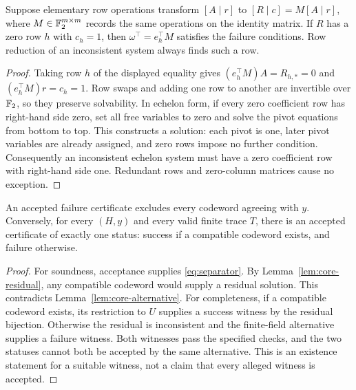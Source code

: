 \begin{prop}\label{prop:core-extraction}
Suppose elementary row operations transform $[A\mid r]$ to
$[R\mid c]=M[A\mid r]$, where $M\in\mathbb{F}_2^{m\times m}$ records the
same operations on the identity matrix. If $R$ has a zero row $h$
with $c_h=1$, then $\omega^\top=e_h^\top M$ satisfies the failure
conditions. Row reduction of an inconsistent system always finds
such a row.
\end{prop}
\begin{proof}
Taking row $h$ of the displayed equality gives
$(e_h^\top M)A=R_{h,*}=0$ and $(e_h^\top M)r=c_h=1$.
Row swaps and adding one row to another are invertible over $\mathbb{F}_2$,
so they preserve solvability. In echelon form, if every zero coefficient
row has right-hand side zero, set all free variables to zero and solve
the pivot equations from bottom to top. This constructs a solution:
each pivot is one, later pivot variables are already assigned, and
zero rows impose no further condition. Consequently an inconsistent
echelon system must have a zero coefficient row with right-hand side
one. Redundant rows and zero-column matrices cause no exception.
\end{proof}

\begin{thm}\label{thm:core-failure}
An accepted failure certificate excludes every codeword agreeing with
$y$. Conversely, for every $(H,y)$ and every valid finite trace $T$,
there is an accepted certificate of exactly one status: success if a
compatible codeword exists, and failure otherwise.
\end{thm}
\begin{proof}
For soundness, acceptance supplies \eqref{eq:separator}. By
Lemma~\ref{lem:core-residual}, any compatible codeword would supply
a residual solution. This contradicts Lemma~\ref{lem:core-alternative}.
For completeness, if a compatible codeword exists, its restriction
to $U$ supplies a success witness by the residual bijection.
Otherwise the residual is inconsistent and the finite-field
alternative supplies a failure witness. Both witnesses pass the
specified checks, and the two statuses cannot both be accepted by
the same alternative. This is an existence statement for a suitable
witness, not a claim that every alleged witness is accepted.
\end{proof}

